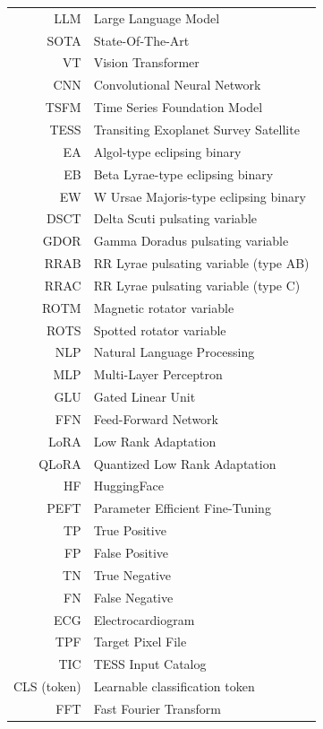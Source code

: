 \documentclass[english,bachelor,oneside]{ctufit-thesis}
\begin{document}
    \begin{tabular}{rl}
        LLM  & Large Language Model         \\
        SOTA & State-Of-The-Art             \\
        VT & Vision Transformer \\
        CNN  & Convolutional Neural Network \\
        TSFM & Time Series Foundation Model \\
        TESS & Transiting Exoplanet Survey Satellite \\
        EA & Algol-type eclipsing binary \\
        EB & Beta Lyrae-type eclipsing binary \\
        EW & W Ursae Majoris-type eclipsing binary \\
        DSCT & Delta Scuti pulsating variable \\
        GDOR & Gamma Doradus pulsating variable \\
        RRAB & RR Lyrae pulsating variable (type AB) \\
        RRAC & RR Lyrae pulsating variable (type C) \\
        ROTM & Magnetic rotator variable \\
        ROTS & Spotted rotator variable \\
        NLP & Natural Language Processing \\
        MLP & Multi-Layer Perceptron \\
        GLU & Gated Linear Unit \\
        FFN & Feed-Forward Network \\
        LoRA & Low Rank Adaptation \\
        QLoRA & Quantized Low Rank Adaptation \\
        HF   & HuggingFace                  \\
        PEFT & Parameter Efficient Fine-Tuning \\
        TP   & True Positive                \\
        FP   & False Positive               \\
        TN   & True Negative                \\
        FN   & False Negative               \\
        ECG  & Electrocardiogram            \\
        TPF & Target Pixel File \\
        TIC & TESS Input Catalog \\
        CLS (token) & Learnable classification token \\
        FFT & Fast Fourier Transform \\




    \end{tabular}
    \resumeTOCentries
    \mainmatter\mainmatterinit %
\end{document}
